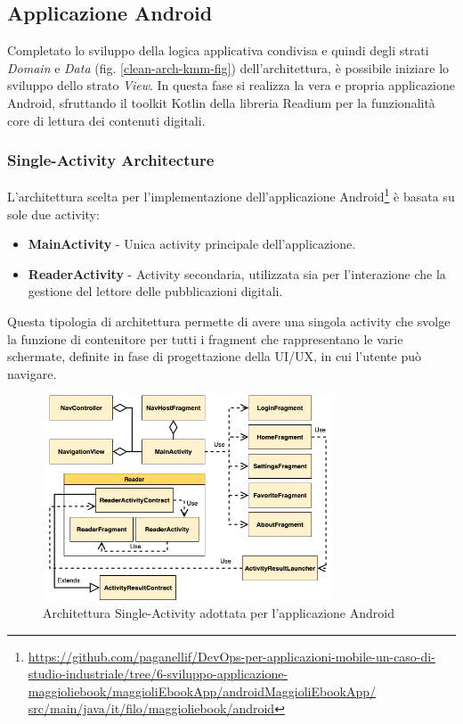 \subsection{Applicazione Android}
Completato lo sviluppo della logica applicativa condivisa e quindi degli strati \textit{Domain} e \textit{Data} (fig. \ref{clean-arch-kmm-fig}) dell'architettura, 
è possibile iniziare lo sviluppo dello strato \textit{View}. 
In questa fase si realizza la vera e propria applicazione Android,
sfruttando il toolkit Kotlin della libreria Readium per la funzionalità core di lettura dei contenuti digitali.

\subsubsection*{Single-Activity Architecture}
L'architettura scelta per l'implementazione dell'applicazione Android\footnote{\href{https://github.com/paganellif/DevOps-per-applicazioni-mobile-un-caso-di-studio-industriale/tree/6-sviluppo-applicazione-maggioliebook/maggioliEbookApp/androidMaggioliEbookApp/src/main/java/it/filo/maggioliebook/android}{https://github.com/paganellif/DevOps-per-applicazioni-mobile-un-caso-di-studio-industriale/tree/6-sviluppo-applicazione-maggioliebook/maggioliEbookApp/androidMaggioliEbookApp/\\src/main/java/it/filo/maggioliebook/android}} è basata su sole due activity:

\begin{itemize}
    \item \textbf{MainActivity} - Unica activity principale dell'applicazione.
    
    \item \textbf{ReaderActivity} - Activity secondaria, utilizzata sia per l'interazione che la gestione del lettore delle pubblicazioni digitali.
\end{itemize}

Questa tipologia di architettura permette di avere una singola activity che svolge la funzione di contenitore per tutti i fragment che rappresentano le varie schermate, 
definite in fase di progettazione della UI/UX, 
in cui l'utente può navigare.

\begin{figure}[H]
    \centering
    \includegraphics[width=0.77\textwidth]{img/android-arch.png}
    \caption{Architettura Single-Activity adottata per l'applicazione Android}
    \label{android-arch-png}
\end{figure}

